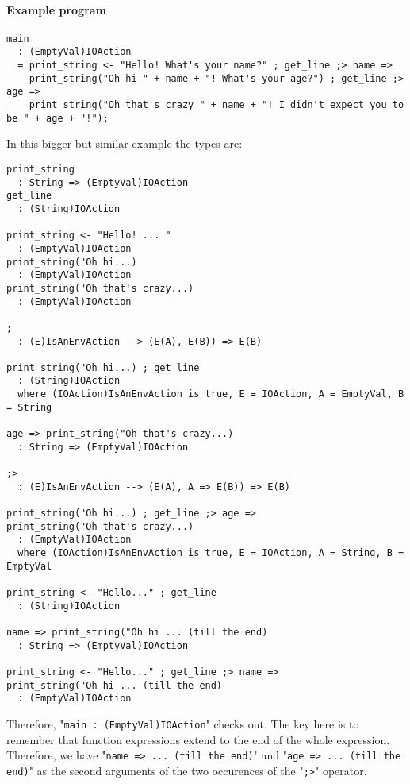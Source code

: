 \documentclass{article}
\begin{document}
\paragraph{Example program}
\begin{verbatim}
main
  : (EmptyVal)IOAction
  = print_string <- "Hello! What's your name?" ; get_line ;> name =>
    print_string("Oh hi " + name + "! What's your age?") ; get_line ;> age =>
    print_string("Oh that's crazy " + name + "! I didn't expect you to be " + age + "!");
\end{verbatim}
In this bigger but similar example the types are:
\begin{verbatim}
print_string
  : String => (EmptyVal)IOAction
get_line
  : (String)IOAction

print_string <- "Hello! ... "
  : (EmptyVal)IOAction
print_string("Oh hi...)
  : (EmptyVal)IOAction
print_string("Oh that's crazy...)
  : (EmptyVal)IOAction

;
  : (E)IsAnEnvAction --> (E(A), E(B)) => E(B) 

print_string("Oh hi...) ; get_line
  : (String)IOAction
  where (IOAction)IsAnEnvAction is true, E = IOAction, A = EmptyVal, B = String

age => print_string("Oh that's crazy...)
  : String => (EmptyVal)IOAction

;>
  : (E)IsAnEnvAction --> (E(A), A => E(B)) => E(B) 

print_string("Oh hi...) ; get_line ;> age =>
print_string("Oh that's crazy...)
  : (EmptyVal)IOAction
  where (IOAction)IsAnEnvAction is true, E = IOAction, A = String, B = EmptyVal

print_string <- "Hello..." ; get_line
  : (String)IOAction

name => print_string("Oh hi ... (till the end)
  : String => (EmptyVal)IOAction

print_string <- "Hello..." ; get_line ;> name =>
print_string("Oh hi ... (till the end)
  : (EmptyVal)IOAction
\end{verbatim}
Therefore, "\texttt{main\ :\ (EmptyVal)IOAction}" checks out.  The key here is
to remember that function expressions extend to the end of the whole
expression. Therefore, we have "\texttt{name => ... (till the end)}" and
"\texttt{age => ... (till the end)}" as the second arguments of the two
occurences of the "\texttt{;>}" operator. 
\end{document}
